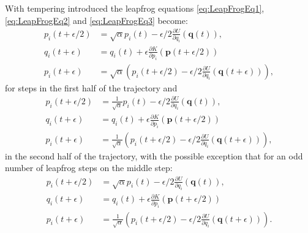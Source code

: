\documentclass[12pt]{article}
\begin{document}
        With tempering introduced the leapfrog equations \ref{eq:LeapFrogEq1}, \ref{eq:LeapFrogEq2} and \ref{eq:LeapFrogEq3} become:
        \begin{align}
            \label{eq:TLeapFrogEq1} p_i\left(t+\epsilon/2\right) & = \sqrt{\alpha}p_i\left(t\right) - \epsilon/2\frac{\partial U}{\partial q_i}\left(\bm{q}\left(t\right)\right), \\
            \label{eq:TLeapFrogEq2}q_i\left(t+\epsilon\right) & = q_i\left(t\right) + \epsilon\frac{\partial K}{\partial p_i}\left(\bm{p}\left(t+\epsilon/2\right)\right) \\
            \label{eq:TLeapFrogEq3}p_i\left(t+\epsilon\right) & = \sqrt{\alpha}\left(p_i\left(t+\epsilon/2\right) - \epsilon/2\frac{\partial U}{\partial q_i}\left(\bm{q}\left(t+\epsilon\right)\right)\right),
        \end{align}
        for steps in the first half of the trajectory and 
        \begin{align}
            p_i\left(t+\epsilon/2\right) & = \frac{1}{\sqrt{\alpha}}p_i\left(t\right) - \epsilon/2\frac{\partial U}{\partial q_i}\left(\bm{q}\left(t\right)\right), \\
            q_i\left(t+\epsilon\right) & = q_i\left(t\right) + \epsilon\frac{\partial K}{\partial p_i}\left(\bm{p}\left(t+\epsilon/2\right)\right) \\
            p_i\left(t+\epsilon\right) & = \frac{1}{\sqrt{\alpha}}\left(p_i\left(t+\epsilon/2\right) - \epsilon/2\frac{\partial U}{\partial q_i}\left(\bm{q}\left(t+\epsilon\right)\right)\right),
        \end{align}
        in the second half of the trajectory, with the possible exception that for an odd number of leapfrog steps on the middle step:
        \begin{align}
             p_i\left(t+\epsilon/2\right) & = \sqrt{\alpha}p_i\left(t\right) - \epsilon/2\frac{\partial U}{\partial q_i}\left(\bm{q}\left(t\right)\right), \\
            q_i\left(t+\epsilon\right) & = q_i\left(t\right) + \epsilon\frac{\partial K}{\partial p_i}\left(\bm{p}\left(t+\epsilon/2\right)\right) \\
            p_i\left(t+\epsilon\right) & = \frac{1}{\sqrt{\alpha}}\left(p_i\left(t+\epsilon/2\right) - \epsilon/2\frac{\partial U}{\partial q_i}\left(\bm{q}\left(t+\epsilon\right)\right)\right).
        \end{align}
\end{document}
